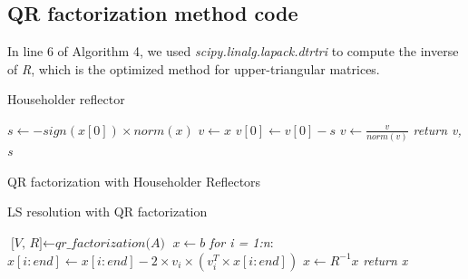 \documentclass{article}
\begin{document}
\subsection{QR factorization method code}\label{subsec:qr-code}
In line 6 of Algorithm 4, we used \textit{scipy.linalg.lapack.dtrtri} to compute the inverse of \textit{R}, which is the optimized method for upper-triangular matrices.
\makeatletter
\def\BState{\State\hskip-\ALG@thistlm}
\makeatother
\begin{algorithm}
\caption{Householder reflector}
\begin{algorithmic}[1]
\State $s \gets -sign(x[0]) \times norm(x)$
\State $v \gets x$
\State $v[0] \gets v[0] -s$
\State $v \gets \frac{v}{norm(v)}$
\State \textit{return v, s}
\EndFunction
\end{algorithmic}
\end{algorithm}
\makeatletter
\makeatother
\begin{algorithm}
\caption{QR factorization with Householder Reflectors}
\end{algorithm}
\makeatletter
\makeatother
\begin{algorithm}
\caption{LS resolution with QR factorization}
\begin{algorithmic}[1]
\State $\textit{[V, R]} \gets \textit{qr\_factorization(A)}$
\State $x \gets b$
\State \emph{for i = 1:n}:
\State \quad$x[i:end] \gets x[i:end] - 2 \times v_{i} \times (v_{i}^{T} \times x[i:end])$
\State $x \gets R^{-1}x$
\State \textit{return x}
\EndFunction
\end{algorithmic}
\end{algorithm}
\end{document}
